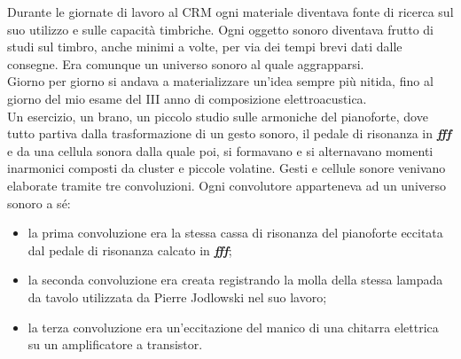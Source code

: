 Durante le giornate di lavoro al CRM ogni materiale diventava fonte di ricerca sul suo utilizzo e sulle capacità timbriche. Ogni oggetto sonoro diventava frutto di studi sul timbro, anche minimi a volte, per via dei tempi brevi dati dalle consegne. Era comunque un universo sonoro al quale aggrapparsi. \\
Giorno per giorno si andava a materializzare un'idea sempre più nitida, fino al giorno del mio esame del III anno di composizione elettroacustica. \\
Un esercizio, un brano, un piccolo studio sulle armoniche del pianoforte, dove tutto partiva dalla trasformazione di un gesto sonoro, il pedale di risonanza in \textit{\textbf{fff}} e da una cellula sonora dalla quale poi, si formavano e si alternavano momenti inarmonici composti da cluster e piccole volatine. Gesti e cellule sonore venivano elaborate tramite tre convoluzioni. Ogni convolutore apparteneva ad un universo sonoro a sé:
\begin{itemize}
\item{la prima convoluzione era la stessa cassa di risonanza del pianoforte eccitata dal pedale di risonanza calcato in \textit{\textbf{fff}};}
\item{la seconda convoluzione era creata registrando la molla della stessa lampada da tavolo utilizzata da Pierre Jodlowski nel suo lavoro;}
\item{la terza convoluzione era un'eccitazione del manico di una chitarra elettrica su un amplificatore a transistor.}
\end{itemize}

